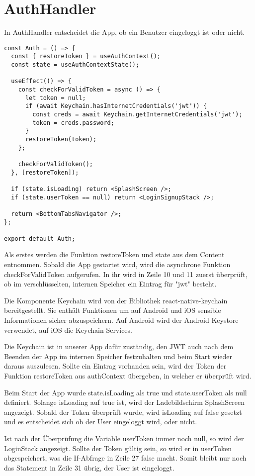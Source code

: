 \section{AuthHandler}
In AuthHandler entscheidet die App, ob ein Benutzer eingeloggt ist oder nicht.

\begin{lstlisting}
const Auth = () => {
  const { restoreToken } = useAuthContext();
  const state = useAuthContextState();

  useEffect(() => {
    const checkForValidToken = async () => {
      let token = null;
      if (await Keychain.hasInternetCredentials('jwt')) {
        const creds = await Keychain.getInternetCredentials('jwt');
        token = creds.password;
      }
      restoreToken(token);
    };

    checkForValidToken();
  }, [restoreToken]);

  if (state.isLoading) return <SplashScreen />;
  if (state.userToken == null) return <LoginSignupStack />;

  return <BottomTabsNavigator />;
};

export default Auth;
\end{lstlisting}

Als erstes werden die Funktion restoreToken und state aus dem Content entnommen. Sobald die App
gestartet wird, wird die asynchrone Funktion checkForValidToken aufgerufen. In ihr wird in Zeile 10
und 11 zuerst überprüft, ob im verschlüsselten, internen Speicher ein Eintrag für "jwt" besteht.

Die Komponente Keychain wird von der Bibliothek react-native-keychain bereitgestellt. Sie enthält
Funktionen um auf Android und iOS sensible Informationen sicher abzuspeichern. Auf Android wird der
Android Keystore verwendet, auf iOS die Keychain Services.

Die Keychain ist in unserer App dafür zuständig, den JWT auch nach dem Beenden der App im internen
Speicher festzuhalten und beim Start wieder daraus auszulesen. Sollte ein Eintrag vorhanden sein,
wird der Token der Funktion restoreToken aus authContext übergeben, in welcher er überprüft wird.

Beim Start der App wurde state.isLoading als true und state.userToken als null definiert. Solange
isLoading auf true ist, wird der Ladebildschirm SplashScreen angezeigt. Sobald der Token überprüft
wurde, wird isLoading auf false gesetzt und es entscheidet sich ob der User eingeloggt wird, oder
nicht.

Ist nach der Überprüfung die Variable userToken immer noch null, so wird der LoginStack angezeigt.
Sollte der Token gültig sein, so wird er in userToken abgespeichert, was die If-Abfrage in Zeile 27
false macht. Somit bleibt nur noch das Statement in Zeile 31 übrig, der User ist eingeloggt.
